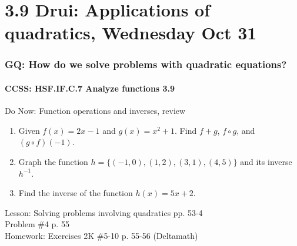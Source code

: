 \documentclass{beamer}
\begin{document}
\section{3.9 Drui: Applications of quadratics, Wednesday Oct 31}
  \frame
  {
    \frametitle{GQ: How do we solve problems with quadratic equations?}
    \framesubtitle{CCSS: HSF.IF.C.7 Analyze functions    \alert{3.9}}

    \begin{block}{Do Now: Function operations and inverses, review}
      \begin{enumerate}
        \item Given $f(x)=2x-1$ and $g(x)=x^2+1$. Find $f+g$, $f \circ g$, and $(g \circ f)(-1)$.
        \item Graph the function $h=\{(-1,0),(1, 2),(3, 1), (4,5)\}$ and its inverse $h^{-1}$.
        \item Find the inverse of the function $h(x)=5x+2$.
      \end{enumerate}
    \end{block}
    Lesson: Solving problems involving quadratics pp. 53-4 \\
    Problem \#4 p. 55 \\ \bigskip
    Homework: Exercises 2K \#5-10 p. 55-56 (Deltamath)
  }
\end{document}

